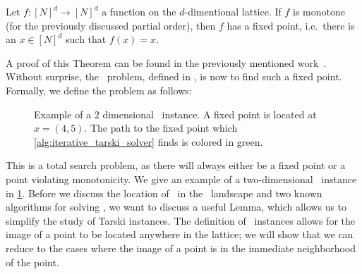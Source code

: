 \begin{theorem}
	Let $f : {[N]}^d \rightarrow {[N]}^d$ a function on the $d$-dimentional lattice. If $f$ is monotone (for the previously discussed partial order), then $f$ has a fixed point, i.e.\ there is an $x \in {[N]}^d$ such that $f(x)=x$.
\end{theorem}

A proof of this Theorem can be found in the previously mentioned work~\cite{tarski_lattice-theoretical_1955}. Without surprise, the \Tarski\ problem, defined in , is now to find such a fixed point. Formally, we define the problem as follows:

\begin{figure}
	\centering
	\caption[Example of a \Tarski\ instance]{Example of a 2 dimensional \Tarski\ instance. A fixed point is located at $x = (4, 5)$. The path to the fixed point which \cref{alg:iterative_tarski_solver} finds is colored in green.}
	\label{fig:tarski_example}
\end{figure}

This is a total search problem, as there will always either be a fixed point or a point violating monotonicity. We give an example of a two-dimensional \Tarski\ instance in \cref{fig:tarski_example}. Before we discuss the location of \Tarski\ in the \TFNP\ landscape and two known algorithms for solving \Tarski, we want to discuss a useful Lemma, which allows us to simplify the study of Tarski instances. The definition of \Tarski\ instances allows for the image of a point to be located anywhere in the lattice; we will show that we can reduce to the cases where the image of a point is in the immediate neighborhood of the point.

